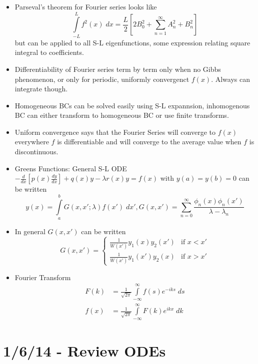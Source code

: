 \documentclass[10pt]{report}
\newcommand{\rd}[2]{\frac{d#1}{d#2}}
\begin{document}
\begin{itemize}
    \item Parseval's theorem for Fourier series looks like 
        $$\displaystyle\int\limits_{-L}^{L}f^2(x)\;dx = \frac{L}{2}\left[ 2B_0^2 + \sum_{n=1}^{\infty}A_n^2 + B_n^2 \right]$$
        but can be applied to all S-L eigenfunctions, some expression relating square integral to coefficients. 
    \item Differentiability of Fourier series term by term only when no Gibbs phenomenon, or only for periodic, uniformly convergenct $f(x)$. Always can integrate though.
    \item Homogeneous BCs can be solved easily using S-L expannsion, inhomogenous BC can either transform to homogeneous BC or use finite transforms.
    \item Uniform convergence says that the Fourier Series will converge to $f(x)$ everywhere $f$ is differentiable and will converge to the average value when $f$ is discontinuous.
    \item Greens Functions: General S-L ODE $-\rd{}{x}\left[ p(x)\rd{y}{x} \right] + q(x)y - \lambda r(x)y = f(x)$ with $y(a) = y(b) = 0$ can be written
        \begin{equation}
            y(x) = \displaystyle\int\limits_{a}^{b}G(x,x';\lambda)f(x')\;dx', G(x,x') = \sum_{n=0}^{\infty}\frac{\phi_n(x)\phi_n(x')}{\lambda - \lambda_n}
        \end{equation}
    \item In general $G(x,x')$ can be written
        \begin{equation}
            G(x,x') =
            \begin{cases}
                \frac{1}{W(x')}y_1(x)y_2(x')& \mbox{if } x < x'\\
                \frac{1}{W(x')}y_1(x')y_2(x)& \mbox{if } x > x'
            \end{cases}
        \end{equation}
    \item Fourier Transform
        \begin{align}
            F(k) &= \frac{1}{\sqrt{2\pi}}\displaystyle\int\limits_{-\infty}^{\infty}f(s)e^{-iks}\;ds\\
            f(x) & =\frac{1}{\sqrt{2\pi}}\displaystyle\int\limits_{-\infty}^{\infty}F(k)e^{ikx}\;dk
        \end{align}

\end{itemize}

\chapter{1/6/14 - Review ODEs}
\end{document}
